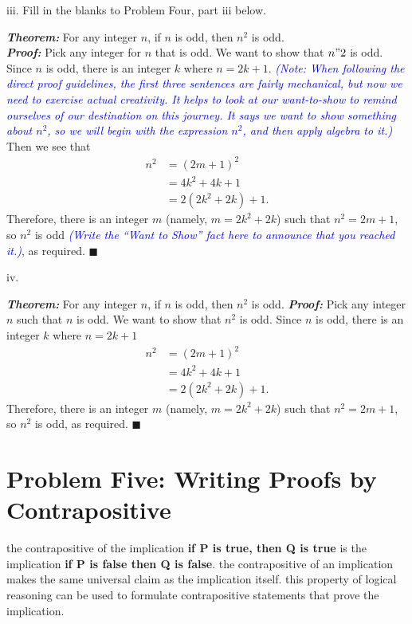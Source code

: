 \documentclass{article}
\renewcommand{\(}{\left(}
\renewcommand{\)}{\right)}
\renewcommand\qedsymbol{$\blacksquare$}
\renewcommand{\emph}[1]{\textit{\textbf{#1}}}
\newcommand{\annotate}[1]{\textit{\textcolor{blue}{#1}}}
\theoremstyle{plain}
\theoremstyle{plain}
\theoremstyle{definition}
\begin{document}
iii. Fill in the blanks to Problem Four, part iii below.
\begin{center}
\begin{boxedminipage}{0.9\textwidth}
\emph{Theorem:} For any integer $n$, if $n$ is odd, then $n^2$ is odd. \\
\emph{Proof: } Pick any integer for $n$ that is odd. We want to show that $n"2$ is odd. Since $n$ is odd, there is an integer $k$ where $n = 2k + 1$.
\annotate{(Note: When following the direct proof guidelines, the first three sentences are fairly mechanical, but now we need to exercise actual creativity. It helps to look at our want-to-show to remind ourselves of our destination on this journey. It says we want to show something about $n^2$, so we will begin with the expression $n^2$, and then apply algebra to it.)}
Then we see that
\begin{equation*}
\begin{split}
n^{2} &=  (2m + 1)^2\\
&=  4k^2 + 4k + 1 \\
&=  2(2k^2 + 2k) + 1.
\end{split}
\end{equation*}
Therefore, there is an integer $m$ (namely, $m = 2k^2 + 2k$) such that $n^2 = 2m + 1$,
so $n^2$ is odd \annotate{(Write the ``Want to Show'' fact here to announce that you
reached it.)}, as required. \qedsymbol
\end{boxedminipage}
\end{center}
iv.
\begin{shaded}
\textbf\textit{Theorem:} For any integer $n$, if $n$ is odd, then $n^2$ is odd.
\textbf\textit{Proof:} Pick any integer $n$ such that $n$ is odd. We want to show that $n^2$ is
odd. Since $n$ is odd, there is an integer $k$ where $n = 2k + 1$
\begin{equation*}
\begin{split}
n^{2} &=  (2m + 1)^2\\
&=  4k^2 + 4k + 1 \\
&=  2(2k^2 + 2k) + 1.
\end{split}
\end{equation*}
Therefore, there is an integer $m$ (namely, $m = 2k^2 + 2k$) such that $n^2 = 2m + 1$,
so $n^2$ is odd, as required. \qedsymbol
\end{shaded}

\newpage

\section*{Problem Five: Writing Proofs by Contrapositive}
\begin{shaded}
the contrapositive of the implication \textbf{if P is true, then Q is true} is the implication
\textbf{if P is false then Q is false}. the contrapositive of an implication makes the same universal
claim as the implication itself. this property of logical reasoning can be used to formulate
contrapositive statements that prove the implication.
\end{shaded}
\end{document}
